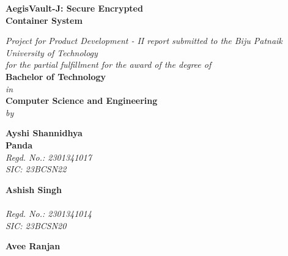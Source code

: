 \clearpage
\thispagestyle{plain}
\renewcommand{\headrulewidth}{0pt} %
\renewcommand{\footrulewidth}{0pt}
\fancyfoot[RO,LE]{\thepage}
\fancyhead[RE]{}
\fancyhead[LO]{}
\fancyhead[RO]{}
\fancyhead[LE]{}
\clearpage
{}
\setcounter{page}{1}
\newpage
\thispagestyle{empty}
\begin{center}
\begin{center}
	{\huge \textbf {AegisVault-J: Secure Encrypted\\Container System}} \\
\end{center}
  \vspace*{0.5cm}
  \textit{Project for Product Development - II report submitted to the Biju Patnaik University of Technology \\ for the partial fulfillment for the award of the degree of} \\ 
    \textbf{Bachelor of Technology} \\
    \textit{in} \\
    \textbf{Computer Science and Engineering} \\
    \vspace*{0.3cm}
    \textit{by}\\
    \vspace*{0.3cm}
    \begin{minipage}[t]{.24\textwidth}
    	\centering
    	\textbf{Ayshi Shannidhya\\Panda}\\
    	\textit{Regd. No.: 2301341017}\\
    	\textit{SIC: 23BCSN22}
    \end{minipage}
    \begin{minipage}[t]{.24\textwidth}
    	\centering
    	\textbf{Ashish Singh}\\[0.3em]~\\
    	\textit{Regd. No.: 2301341014}\\
    	\textit{SIC: 23BCSN20}
    \end{minipage}
    \begin{minipage}[t]{.24\textwidth}
    	\centering
    	\textbf{Avee Ranjan}\\[0.3em]~\\

\end{minipage}
\end{center}
